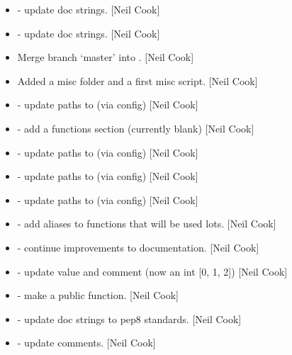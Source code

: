 \documentclass[a4paper,10pt,english]{report}
\begin{document}
\begin{itemize}
\item {} 
 - update doc strings. {[}Neil Cook{]}

\item {} 
 - update doc strings. {[}Neil Cook{]}

\item {} 
Merge branch ‘master’ into . {[}Neil Cook{]}

\item {} 
Added a misc folder and a first misc script. {[}Neil Cook{]}

\item {} 
 - update paths to  (via config) {[}Neil Cook{]}

\item {} 
 - add a functions section (currently blank) {[}Neil Cook{]}

\item {} 
 - update paths to  (via config) {[}Neil Cook{]}

\item {} 
 - update paths to  (via config) {[}Neil Cook{]}

\item {} 
 - update paths to  (via config) {[}Neil Cook{]}

\item {} 
 - add aliases to functions that will be used lots.
{[}Neil Cook{]}

\item {} 
 - continue improvements to documentation. {[}Neil Cook{]}

\item {} 
 - update  value and comment (now an int
{[}0, 1, 2{]}) {[}Neil Cook{]}

\item {} 
 - make  a public function. {[}Neil Cook{]}

\item {} 
 - update doc strings to pep8 standards. {[}Neil Cook{]}

\item {} 
 - update comments. {[}Neil Cook{]}


\end{itemize}
\end{document}
